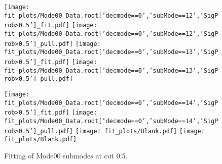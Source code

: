 \begin{figure}[p!]
\begin{center}
\texttt{[image: fit\_plots/Mode00\_Data.root['decmode==0','subMode==12','SigProb>0.5']\_fit.pdf]}
\texttt{[image: fit\_plots/Mode00\_Data.root['decmode==0','subMode==12','SigProb>0.5']\_pull.pdf]}
\texttt{[image: fit\_plots/Mode00\_Data.root['decmode==0','subMode==13','SigProb>0.5']\_fit.pdf]}
\texttt{[image: fit\_plots/Mode00\_Data.root['decmode==0','subMode==13','SigProb>0.5']\_pull.pdf]}

\texttt{[image: fit\_plots/Mode00\_Data.root['decmode==0','subMode==14','SigProb>0.5']\_fit.pdf]}
\texttt{[image: fit\_plots/Mode00\_Data.root['decmode==0','subMode==14','SigProb>0.5']\_pull.pdf]}
\texttt{[image: fit\_plots/Blank.pdf]}
\texttt{[image: fit\_plots/Blank.pdf]}

\caption{Fitting of Mode00 submodes at cut 0.5.}
\label{fig:fitMode00}
\end{center}
\end{figure}
